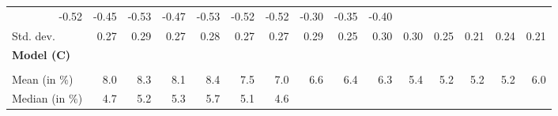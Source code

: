 \begin{tabular}{lllllllllllllll}
  \multicolumn{1}{r}{-0.52} &
  \multicolumn{1}{r}{-0.45} &
  \multicolumn{1}{r}{-0.53} &
  \multicolumn{1}{r}{-0.47} &
  \multicolumn{1}{r}{-0.53} &
  \multicolumn{1}{r}{-0.52} &
  \multicolumn{1}{r}{-0.52} &
  \multicolumn{1}{r}{-0.30} &
  \multicolumn{1}{r}{-0.35} &
  \multicolumn{1}{r}{-0.40} \\
\multicolumn{1}{l}{\hspace{2em}Std. dev.} &
  \multicolumn{1}{|r}{0.27} &
  \multicolumn{1}{r}{0.29} &
  \multicolumn{1}{r}{0.27} &
  \multicolumn{1}{r}{0.28} &
  \multicolumn{1}{r}{0.27} &
  \multicolumn{1}{r}{0.27} &
  \multicolumn{1}{r}{0.29} &
  \multicolumn{1}{r}{0.25} &
  \multicolumn{1}{r}{0.30} &
  \multicolumn{1}{r}{0.30} &
  \multicolumn{1}{r}{0.25} &
  \multicolumn{1}{r}{0.21} &
  \multicolumn{1}{r}{0.24} &
  \multicolumn{1}{r}{0.21} \\
\multicolumn{1}{l}{{\textbf{Model (C)}}} &
  \multicolumn{1}{|r}{} &
  \multicolumn{1}{r}{} &
  \multicolumn{1}{r}{} &
  \multicolumn{1}{r}{} &
  \multicolumn{1}{r}{} &
  \multicolumn{1}{r}{} &
  \multicolumn{1}{r}{} &
  \multicolumn{1}{r}{} &
  \multicolumn{1}{r}{} &
  \multicolumn{1}{r}{} &
  \multicolumn{1}{r}{} &
  \multicolumn{1}{r}{} &
  \multicolumn{1}{r}{} &
  \multicolumn{1}{r}{} \\
\multicolumn{1}{l}{\hspace{1em}{\textit{Additive term} ($\widehat{t}^{add}/\widetilde{p}$)}} &
  \multicolumn{1}{|r}{} &
  \multicolumn{1}{r}{} &
  \multicolumn{1}{r}{} &
  \multicolumn{1}{r}{} &
  \multicolumn{1}{r}{} &
  \multicolumn{1}{r}{} &
  \multicolumn{1}{r}{} &
  \multicolumn{1}{r}{} &
  \multicolumn{1}{r}{} &
  \multicolumn{1}{r}{} &
  \multicolumn{1}{r}{} &
  \multicolumn{1}{r}{} &
  \multicolumn{1}{r}{} &
  \multicolumn{1}{r}{} \\
\multicolumn{1}{l}{\hspace{2em}Mean (in $\%$)} &
  \multicolumn{1}{|r}{8.0} &
  \multicolumn{1}{r}{8.3} &
  \multicolumn{1}{r}{8.1} &
  \multicolumn{1}{r}{8.4} &
  \multicolumn{1}{r}{7.5} &
  \multicolumn{1}{r}{7.0} &
  \multicolumn{1}{r}{6.6} &
  \multicolumn{1}{r}{6.4} &
  \multicolumn{1}{r}{6.3} &
  \multicolumn{1}{r}{5.4} &
  \multicolumn{1}{r}{5.2} &
  \multicolumn{1}{r}{5.2} &
  \multicolumn{1}{r}{5.2} &
  \multicolumn{1}{r}{6.0} \\
\multicolumn{1}{l}{\hspace{2em}Median (in $\%$)} &
  \multicolumn{1}{|r}{4.7} &
  \multicolumn{1}{r}{5.2} &
  \multicolumn{1}{r}{5.3} &
  \multicolumn{1}{r}{5.7} &
  \multicolumn{1}{r}{5.1} &
  \multicolumn{1}{r}{4.6} &

\end{tabular}
